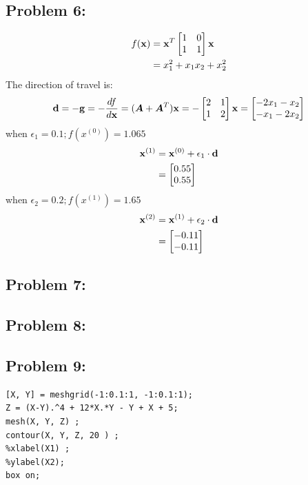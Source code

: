 \documentclass{article}
\begin{document}
\subsection*{Problem 6: } 
\begin{align*} 
f(\boldsymbol{\mathrm{x}}) & = \boldsymbol{\mathrm{x}}^T\begin{bmatrix} 1 & 0 \\ 1 & 1  \end{bmatrix} \boldsymbol{\mathrm{x}} \\
& = x_1^2 + x_1x_2 + x_2^2 \\
\end{align*} 
The direction of travel is:  \\
\begin{align*} 
\boldsymbol{\mathrm{d}} = -\boldsymbol{\mathrm{g}} = -\frac{df}{d\boldsymbol{\mathrm{x}}} = (\boldsymbol{A} + \boldsymbol{A}^T) \boldsymbol{\mathrm{x}} = -\begin{bmatrix} 2 & 1 \\ 1 & 2  \end{bmatrix} \boldsymbol{\mathrm{x}}  = \begin{bmatrix} -2x_1-x_2 \\ -x_1-2x_2 \end{bmatrix}\\
\end{align*} 
when $ \epsilon_1  = 0.1;  f(x^{(0)} )= 1.065 $ \\
\begin{align*} 
\boldsymbol{\mathrm{x}}^{(1)} &= \boldsymbol{\mathrm{x}}^{(0)} + \epsilon_1 \cdot \boldsymbol{\mathrm{d}}    \\
	& = \begin{bmatrix} 0.55 \\ 0.55 \end{bmatrix} 
\end{align*} 
when $ \epsilon_2  = 0.2 ; f(x^{(1)} )= 1.65    $\\
\begin{align*} 
\boldsymbol{\mathrm{x}}^{(2)} & = \boldsymbol{\mathrm{x}}^{(1)} + \epsilon_2 \cdot \boldsymbol{\mathrm{d}}    \\
	& = \begin{bmatrix} -0.11 \\ -0.11 \end{bmatrix} 
\end{align*} 

\subsection*{Problem 7: } 


\subsection*{Problem 8: } 


\subsection*{Problem 9: } 
\begin{lstlisting} 
[X, Y] = meshgrid(-1:0.1:1, -1:0.1:1); 
Z = (X-Y).^4 + 12*X.*Y - Y + X + 5; 
mesh(X, Y, Z) ; 
contour(X, Y, Z, 20 ) ; 
%xlabel(X1) ; 
%ylabel(X2); 
box on;
\end{lstlisting} 
\end{document}
